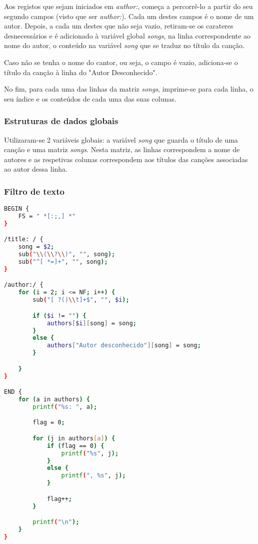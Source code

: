 \documentclass{article}
\begin{document}
Aos registos que sejam iniciados em \emph{author:}, começa a percorrê-lo a partir do seu segundo campos (visto que ser \emph{author:}). Cada um destes campos é o nome de um autor. Depois, a cada um destes que não seja vazio, retiram-se os carateres desnecessários e é adicionado à variável global \emph{songs}, na linha correspondente ao nome do autor, o  conteúdo na variável \emph{song} que se traduz no título da canção.

Caso não se tenha o nome do cantor, ou seja, o campo é vazio, adiciona-se o título da canção à linha do "Autor Desconhecido".

No fim, para cada uma das linhas da matriz \emph{songs}, imprime-se para cada linha, o seu índice e os conteúdos de cada uma das suas colunas.

\subsubsection{Estruturas de dados globais}

Utilizaram-se 2 variáveis globais: a variável \emph{song} que guarda o título de uma canção e uma matriz \emph{songs}. Nesta matriz, as linhas correspondem a nome de autores e as respetivas colunas correspondem aos títulos das canções associadas ao autor dessa linha.

\subsubsection{Filtro de texto}

\begin{lstlisting}[language=bash]
BEGIN {
	FS = " *[:;,] *"
}

/title: / {
	song = $2;
	sub("\\(\\?\\)", "", song);
	sub("^[ *=]+", "", song);
}

/author:/ {
	for (i = 2; i <= NF; i++) {
		sub("[ ?()\\t]+$", "", $i);

		if ($i != "") {
			authors[$i][song] = song;
		}
		else {
			authors["Autor desconhecido"][song] = song;
		}

	}
}

END {
	for (a in authors) {
		printf("%s: ", a);

		flag = 0;		

		for (j in authors[a]) {
			if (flag == 0) {
				printf("%s", j);
			}
			else {
				printf(", %s", j);
			} 

			flag++;
		}

		printf("\n");
	}
}
\end{lstlisting}
\end{document}
